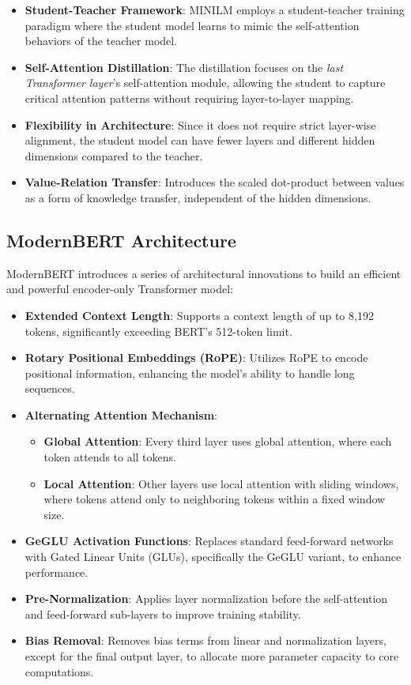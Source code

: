 \documentclass{article}
\begin{document}
\begin{itemize}  
    \item \textbf{Student-Teacher Framework}: MINILM employs a student-teacher training paradigm where the student model learns to mimic the self-attention behaviors of the teacher model.  
    \item \textbf{Self-Attention Distillation}: The distillation focuses on the \emph{last Transformer layer}'s self-attention module, allowing the student to capture critical attention patterns without requiring layer-to-layer mapping.  
    \item \textbf{Flexibility in Architecture}: Since it does not require strict layer-wise alignment, the student model can have fewer layers and different hidden dimensions compared to the teacher.  
    \item \textbf{Value-Relation Transfer}: Introduces the scaled dot-product between values as a form of knowledge transfer, independent of the hidden dimensions.  
\end{itemize}  
  
\subsection{ModernBERT Architecture}  
  
ModernBERT introduces a series of architectural innovations to build an efficient and powerful encoder-only Transformer model:  
  
\begin{itemize}  
    \item \textbf{Extended Context Length}: Supports a context length of up to 8,192 tokens, significantly exceeding BERT's 512-token limit.  
    \item \textbf{Rotary Positional Embeddings (RoPE)}: Utilizes RoPE to encode positional information, enhancing the model's ability to handle long sequences.  
    \item \textbf{Alternating Attention Mechanism}:  
    \begin{itemize}  
        \item \textbf{Global Attention}: Every third layer uses global attention, where each token attends to all tokens.  
        \item \textbf{Local Attention}: Other layers use local attention with sliding windows, where tokens attend only to neighboring tokens within a fixed window size.  
    \end{itemize}  
    \item \textbf{GeGLU Activation Functions}: Replaces standard feed-forward networks with Gated Linear Units (GLUs), specifically the GeGLU variant, to enhance performance.  
    \item \textbf{Pre-Normalization}: Applies layer normalization before the self-attention and feed-forward sub-layers to improve training stability.  
    \item \textbf{Bias Removal}: Removes bias terms from linear and normalization layers, except for the final output layer, to allocate more parameter capacity to core computations.  
\end{itemize}  
  
\end{document}
